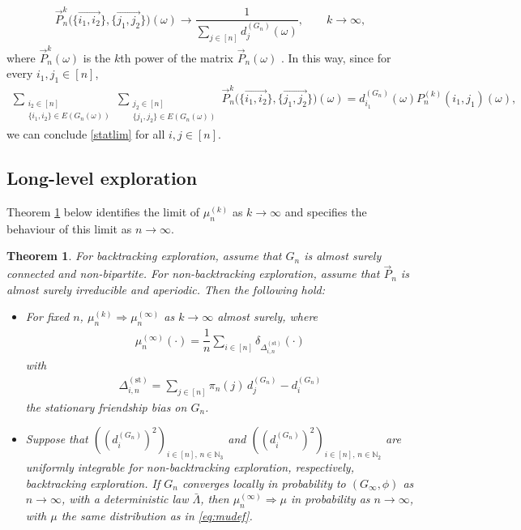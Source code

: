 \documentclass[11pt]{article}
\numberwithin{equation}{section}
\theoremstyle{plain}
\newtheorem{theorem}{Theorem}[section]
\newcommand{\N}{\mathbb N}
\newcommand{\weak}{\Longrightarrow}
\newcommand{\dn}{d^{(G_{n})}}
\newcommand{\Dst}{\Delta^{(\mathrm{st})}}
\begin{document}
\begin{align*}
\vec{P}_{n}^{k}\big(\{\overset{\rightarrow}{i_{1},i_{2}}\},\{\overset{\rightarrow}{j_{1},j_{2}}\}\big)(\omega) \to \dfrac{1}{\sum_{j\in [n]}\dn_{j}(\omega)},\quad\quad k\to\infty ,
\end{align*}
 where $\vec{P}_{n}^{k}(\omega)$ is the $k$th power of the matrix $\vec{P}_{n}(\omega)$ \cite[Theorem 1.8.3]{N}. 
In this way, since for every $i_{1},j_{1}\in [n]$,
 \begin{align*}
 \sum_{\substack{i_{2} \in [n] \\ \{i_{1},i_{2}\} \in E(G_n(\omega))}}\sum_{\substack{j_{2} \in [n] \\\{j_{1},j_{2}\}\in E(G_{n}(\omega))}}\vec{P}_{n}^{k}\big(\{\overset{\rightarrow}{i_{1},i_{2}}\},\{\overset{\rightarrow}{j_{1},j_{2}}\}\big)(\omega) =\dn_{i_{1}}(\omega)P_{n}^{(k)}(i_{1},j_{1})(\omega),
 \end{align*}
we can conclude \eqref{statlim} for all $i,j\in[n]$. 


\subsection{Long-level exploration}
\label{subsec:ll} 

Theorem \ref{thm3} below identifies the limit of $\mu_{n}^{(k)}$ as $k\to\infty$ and specifies the behaviour of this limit as $n \to \infty$.

\begin{theorem}
\label{thm3}
For backtracking exploration, assume that $G_n$ is almost surely connected and non-bipartite. For non-backtracking exploration, assume that $\vec{P}_{n}$ is almost surely irreducible and aperiodic. Then the following hold:
\begin{itemize}
\item[{\rm (a)}] 
For fixed $n$, $\mu_{n}^{(k)} \weak \mu_{n}^{(\infty)}$ as $k\to\infty$ almost surely, where 
\begin{align*}
\mu_{n}^{(\infty)}(\cdot)= \dfrac{1}{n}\sum_{i \in [n]} \delta_{\Dst_{i,n}}(\cdot)
\end{align*}
with
\begin{align}
\label{Deltast}
\Dst_{i,n}= \sum_{j\in [n]}\pi_{n}(j)\,\dn_{j}-\dn_{i}
\end{align}
the stationary friendship bias on $G_n$. 
\item[{\rm (b)}]
Suppose that $((\dn_{i})^{2})_{i\in [n],\,n\in\N_{3}}$ and $((\dn_{i})^{2})_{i\in [n],\,n\in\N_{2}}$ are uniformly integrable for non-backtracking exploration, respectively, backtracking exploration. If $G_n$ converges locally in probability to $(G_{\infty},\phi)$ as $n\to\infty$, with a deterministic law $\bar{\Lambda}$, then $\mu_n^{(\infty)} \weak \mu$ in probability as $n\to\infty$, with $\mu$ the same distribution as in \eqref{eq:mudef}.
\end{itemize}
\end{theorem}
\end{document}
